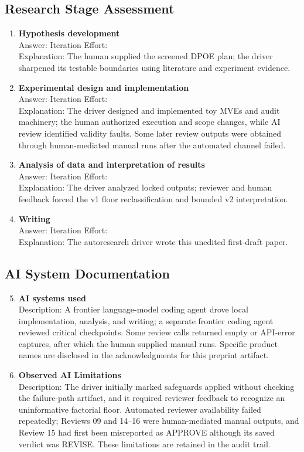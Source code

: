 \documentclass{article}
\begin{document}
\subsection*{Research Stage Assessment}
\begin{enumerate}
\item \textbf{Hypothesis development}\\
Answer: \involvementB{} \quad Iteration Effort: \iterationLow{}\\
Explanation: The human supplied the screened DPOE plan; the driver sharpened its testable boundaries using literature and experiment evidence.
\item \textbf{Experimental design and implementation}\\
Answer: \involvementC{} \quad Iteration Effort: \iterationMedium{}\\
Explanation: The driver designed and implemented toy MVEs and audit machinery; the human authorized execution and scope changes, while AI review identified validity faults. Some later review outputs were obtained through human-mediated manual runs after the automated channel failed.
\item \textbf{Analysis of data and interpretation of results}\\
Answer: \involvementC{} \quad Iteration Effort: \iterationMedium{}\\
Explanation: The driver analyzed locked outputs; reviewer and human feedback forced the v1 floor reclassification and bounded v2 interpretation.
\item \textbf{Writing}\\
Answer: \involvementD{} \quad Iteration Effort: \iterationLow{}\\
Explanation: The autoresearch driver wrote this unedited first-draft paper.
\end{enumerate}
\subsection*{AI System Documentation}
\begin{enumerate}
\setcounter{enumi}{4}
\item \textbf{AI systems used}\\
Description: A frontier language-model coding agent drove local implementation, analysis, and writing; a separate frontier coding agent reviewed critical checkpoints. Some review calls returned empty or API-error captures, after which the human supplied manual runs. Specific product names are disclosed in the acknowledgments for this preprint artifact.
\item \textbf{Observed AI Limitations}\\
Description: The driver initially marked safeguards applied without checking the failure-path artifact, and it required reviewer feedback to recognize an uninformative factorial floor. Automated reviewer availability failed repeatedly; Reviews 09 and 14--16 were human-mediated manual outputs, and Review 15 had first been misreported as APPROVE although its saved verdict was REVISE. These limitations are retained in the audit trail.
\end{enumerate}
\end{document}
